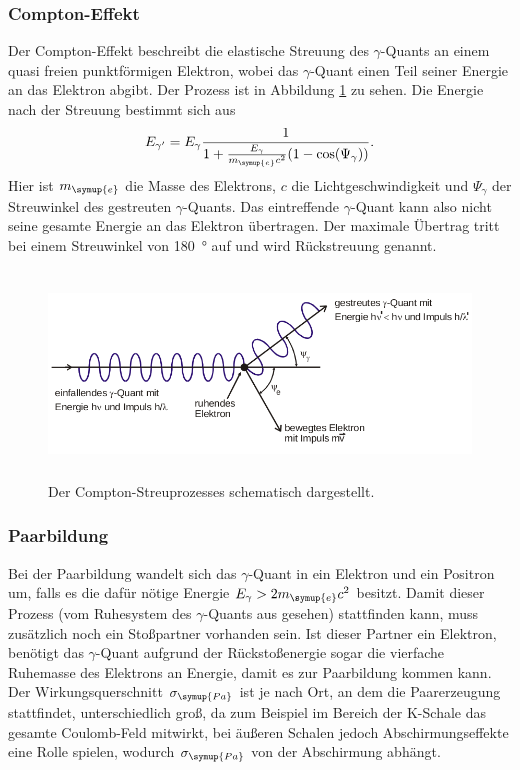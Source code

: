 \subsubsection{Compton-Effekt}
\label{sec:ComEffekt}
Der Compton-Effekt beschreibt die elastische Streuung des $\gamma$-Quants an einem quasi freien punktförmigen Elektron, wobei das $\gamma$-Quant einen Teil seiner Energie an das Elektron abgibt.
Der Prozess ist in Abbildung \ref{fig:Compton} zu sehen.
Die Energie nach der Streuung bestimmt sich aus
\begin{equation}
E_{\gamma'}=E_{\gamma}\frac{1}{1+\frac{E_{\gamma}}{m_{\symup{e}} c^2}(1-\cos(\Psi_{\gamma}))}.
\end{equation}
Hier ist $m_{\symup{e}}$ die Masse des Elektrons, $c$ die Lichtgeschwindigkeit und $\Psi_{\gamma}$ der Streuwinkel des gestreuten $\gamma$-Quants.
Das eintreffende $\gamma$-Quant kann also nicht seine gesamte Energie an das Elektron übertragen.
Der maximale Übertrag tritt bei einem Streuwinkel von \SI{180}{\degree} auf und wird Rückstreuung genannt.
 \begin{figure}
   \centering
   \includegraphics[height=5.5cm]{content/pictures/Compton.png}
   \caption{Der Compton-Streuprozesses schematisch dargestellt.\cite{V18}}
   \label{fig:Compton}
 \end{figure}

\subsubsection{Paarbildung}
\label{sec:Paar}
Bei der Paarbildung wandelt sich das $\gamma$-Quant in ein Elektron und ein Positron um, falls es die dafür nötige Energie $E_{\gamma}>2m_{\symup{e}}c^2$ besitzt.
Damit dieser Prozess (vom Ruhesystem des $\gamma$-Quants aus gesehen) stattfinden kann, muss zusätzlich noch ein Stoßpartner vorhanden sein.
Ist dieser Partner ein Elektron, benötigt das $\gamma$-Quant aufgrund der Rückstoßenergie sogar die vierfache Ruhemasse des Elektrons an Energie, damit es zur Paarbildung kommen kann.
Der Wirkungsquerschnitt $\sigma_{\symup{Pa}}$ ist je nach Ort, an dem die Paarerzeugung stattfindet, unterschiedlich groß, da zum Beispiel im Bereich der K-Schale das gesamte Coulomb-Feld mitwirkt, bei äußeren Schalen
jedoch Abschirmungseffekte eine Rolle spielen, wodurch $\sigma_{\symup{Pa}}$ von der Abschirmung abhängt.

